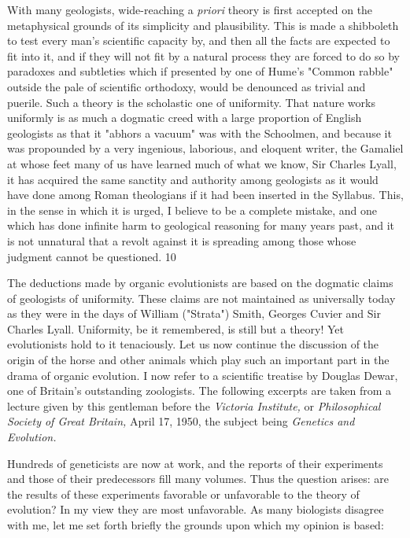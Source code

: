 With many geologists, wide-reaching a \textit{priori} theory is first accepted on the metaphysical
grounds of its simplicity and plausibility. This is made a shibboleth to test every man's
scientific capacity by, and then all the facts are expected to fit into it, and if they will not fit
by a natural process they are forced to do so by paradoxes and subtleties which if presented
by one of Hume's "Common rabble" outside the pale of scientific orthodoxy, would be
denounced as trivial and puerile. Such a theory is the scholastic one of uniformity. That
nature works uniformly is as much a dogmatic creed with a large proportion of English
geologists as that it "abhors a vacuum" was with the Schoolmen, and because it was
propounded by a very ingenious, laborious, and eloquent writer, the Gamaliel at whose feet
many of us have learned much of what we know, Sir Charles Lyall, it has acquired the same
sanctity and authority among geologists as it would have done among Roman theologians if
it had been inserted in the Syllabus. This, in the sense in which it is urged, I believe to be a
complete mistake, and one which has done infinite harm to geological reasoning for many
years past, and it is not unnatural that a revolt against it is spreading among those whose
judgment cannot be questioned. 10

The deductions made by organic evolutionists are based on the dogmatic claims of geologists
of uniformity. These claims are not maintained as universally today as they were in the days
of William ("Strata") Smith, Georges Cuvier and Sir Charles Lyall. Uniformity, be it
remembered, is still but a theory! Yet evolutionists hold to it tenaciously. Let us now
continue the discussion of the origin of the horse and other animals which play such an
important part in the drama of organic evolution. I now refer to a scientific treatise by
Douglas Dewar, one of Britain's outstanding zoologists. The following excerpts are taken
from a lecture given by this gentleman before the \textit{Victoria Institute,} or \textit{Philosophical Society
of Great Britain,} April 17, 1950, the subject being \textit{Genetics and Evolution.}

Hundreds of geneticists are now at work, and the reports of their experiments and those of
their predecessors fill many volumes. Thus the question arises: are the results of these
experiments favorable or unfavorable to the theory of evolution? In my view they are most
unfavorable. As many biologists disagree with me, let me set forth briefly the grounds upon
which my opinion is based:

